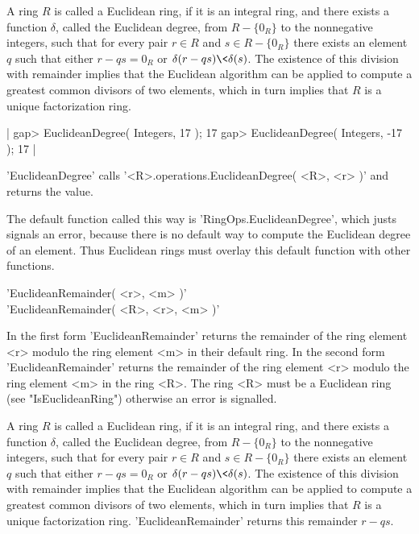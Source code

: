 A  ring $R$ is called a Euclidean  ring,  if it  is an integral ring, and
there exists  a function  $\delta$,  called the  Euclidean  degree,  from
$R-\{0_R\}$ to the nonnegative integers, such  that for every pair $r \in
R$ and $s \in R-\{0_R\}$ there exists an element $q$ such that either  $r
-  q s = 0_R$ or $\delta(r - q s) \< \delta( s )$.  The existence of this
division  with remainder  implies  that  the Euclidean algorithm  can  be
applied to compute a greatest common divisors  of  two elements, which in
turn implies that $R$ is a unique factorization ring.

|    gap> EuclideanDegree( Integers, 17 );
    17
    gap> EuclideanDegree( Integers, -17 );
    17 |

'EuclideanDegree' calls '<R>.operations.EuclideanDegree(  <R>, <r> )' and
returns the value.

The default function called this way is  'RingOps.EuclideanDegree', which
justs signals an error,  because there is no default  way  to compute the
Euclidean degree  of an element.  Thus Euclidean  rings must overlay this
default function with other functions.


'EuclideanRemainder( <r>, <m> )' \\
'EuclideanRemainder( <R>, <r>, <m> )'

In the first form 'EuclideanRemainder' returns the remainder of  the ring
element <r>  modulo the ring element <m> in  their default  ring.  In the
second  form  'EuclideanRemainder' returns  the  remainder  of  the  ring
element <r> modulo the ring element <m> in the  ring  <R>.  The  ring <R>
must be a Euclidean  ring (see  "IsEuclideanRing")  otherwise an error is
signalled.

A ring $R$  is called  a Euclidean ring, if it  is  an integral ring, and
there exists  a  function $\delta$,  called  the Euclidean  degree,  from
$R-\{0_R\}$ to  the nonnegative integers, such that for every pair $r \in
R$ and $s \in R-\{0_R\}$ there exists an  element $q$ such that either $r
- q s = 0_R$ or $\delta(r - q s) \< \delta( s )$.  The  existence of this
division  with  remainder  implies that  the  Euclidean algorithm can  be
applied to  compute a greatest  common divisors of two elements, which in
turn    implies   that   $R$    is   a   unique    factorization    ring.
'EuclideanRemainder' returns this remainder $r - q s$.

